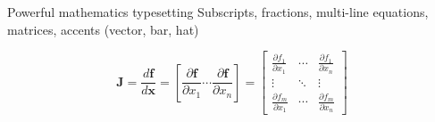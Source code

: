 \documentclass{beamer}
\begin{document}
\begin{frame}{Powerful mathematics typesetting}
Subscripts, fractions, multi-line equations, matrices, accents (vector, bar, hat)
\begin{example}
    $$
\mathbf{J}
=
\frac{d \mathbf{f}}{d \mathbf{x}}
=
\left[ \frac{\partial \mathbf{f}}{\partial x_1}
\cdots \frac{\partial \mathbf{f}}{\partial x_n} \right]
=
\begin{bmatrix}
\frac{\partial f_1}{\partial x_1} & \cdots &
\frac{\partial f_1}{\partial x_n} \\
\vdots & \ddots & \vdots \\
\frac{\partial f_m}{\partial x_1} & \cdots &
\frac{\partial f_m}{\partial x_n}
\end{bmatrix}
$$
\end{example}

\end{frame}
\end{document}
